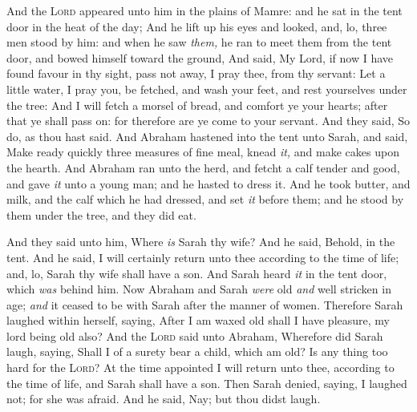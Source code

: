 \documentclass[11pt,letterpaper,oneside]{memoir}
\begin{document}
And the \textsc{Lord} appeared unto him in the plains of Mamre: and he sat
in the tent door in the heat of the day; And he lift up his eyes and
looked, and, lo, three men stood by him: and when he saw \emph{them,} he
ran to meet them from the tent door, and bowed himself toward the
ground, And said, My Lord, if now I have found favour in thy sight, pass
not away, I pray thee, from thy servant: Let a little water, I pray you,
be fetched, and wash your feet, and rest yourselves under the tree: And
I will fetch a morsel of bread, and comfort ye your hearts; after that
ye shall pass on: for therefore are ye come to your servant. And they
said, So do, as thou hast said. And Abraham hastened into the tent unto
Sarah, and said, Make ready quickly three measures of fine meal, knead
\emph{it,} and make cakes upon the hearth. And Abraham ran unto the
herd, and fetcht a calf tender and good, and gave \emph{it} unto a young
man; and he hasted to dress it. And he took butter, and milk, and the
calf which he had dressed, and set \emph{it} before them; and he stood
by them under the tree, and they did eat.

And they said unto him, Where \emph{is} Sarah thy wife? And he said,
Behold, in the tent. And he said, I will certainly return unto thee
according to the time of life; and, lo, Sarah thy wife shall have a son.
And Sarah heard \emph{it} in the tent door, which \emph{was} behind him.
Now Abraham and Sarah \emph{were} old \emph{and} well stricken in age;
\emph{and} it ceased to be with Sarah after the manner of women.
Therefore Sarah laughed within herself, saying, After I am waxed old
shall I have pleasure, my lord being old also? And the \textsc{Lord} said
unto Abraham, Wherefore did Sarah laugh, saying, Shall I of a surety
bear a child, which am old? Is any thing too hard for the \textsc{Lord}?
At the time appointed I will return unto thee, according to the time of
life, and Sarah shall have a son. Then Sarah denied, saying, I laughed
not; for she was afraid. And he said, Nay; but thou didst laugh.
\end{document}
